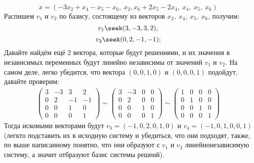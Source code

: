 $$x = (-3x_2 + x_4 - x_5 - x_6,\ x_2, x_6 + 2x_5 - 2x_4,\ x_4,\ x_5,\ x_6)$$
Распишем $v_1$ и $v_2$ по базису, состоящему из векторов $x_2,\ x_4,\ x_5,\ x_6$, получим:
$$v_1 \seek (3, -3, 3, 2),$$
$$v_2 \seek (0, 2, -1, -1);$$
Давайте найдём ещё 2 вектора, которые будут решениями, и их значения в независимых переменных будут линейно независимы от значений $v_1$ и $v_2$. На самом деле, легко убедится, что вектора $(0, 0, 1, 0)$ и $(0, 0, 0, 1)$ подойдут, давайте проверим:
\begin{gather*}
    \begin{pmatrix}
        3 & -3 & 3 & 2\\
        0 & 2 & -1 & -1\\
        0 & 0 & 1 & 0\\
        0 & 0 & 0 & 1
    \end{pmatrix} \sim
    \begin{pmatrix}
        3 & -3 & 0 & 0\\
        0 & 2 & 0 & 0\\
        0 & 0 & 1 & 0\\
        0 & 0 & 0 & 1
    \end{pmatrix} \sim
    \begin{pmatrix}
        1 & 0 & 0 & 0\\
        0 & 1 & 0 & 0\\
        0 & 0 & 1 & 0\\
        0 & 0 & 0 & 1
    \end{pmatrix}
\end{gather*}
Тогда искомыми векторами будут $v_3 = (-1, 0, 2, 0, 1, 0)$ и $v_4 = (-1, 0, 1, 0, 0, 1)$ (легкто подставить их в исходную систему и убедиться, что они подходят, также, по выше написанному понятно, что они образуют с $v_1$ и $v_2$ линейнонезависимую систему, а значит отбразуют базис системы решенй).

